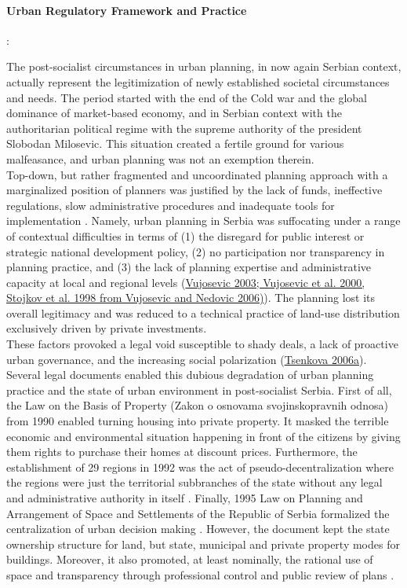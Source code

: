 \documentclass[11pt]{report}
\begin{document}
\paragraph{Urban Regulatory Framework and Practice}:

The post-socialist circumstances in urban planning, in now again Serbian context, actually represent the legitimization of newly established societal circumstances and needs.
The period started with the end of the Cold war and the global dominance of market-based economy, and in Serbian context with the authoritarian political regime with the supreme authority of the president Slobodan Milosevic. This  situation  created a fertile  ground  for various malfeasance, and urban planning was not an exemption therein.
\\

Top-down, but rather fragmented and uncoordinated planning approach with a marginalized position of planners was justified by the lack of funds, 
ineffective regulations, slow administrative procedures and inadequate tools for implementation
\href{ref}{\citealt{peric_evolution_2016}}. 
Namely, urban planning in Serbia was suffocating under a range of contextual difficulties in terms of  (1) the disregard for public interest or strategic national development policy, (2) no participation nor transparency in planning practice, and (3) the lack of planning expertise and administrative capacity at local and regional levels (\href{ref}{Vujosevic  2003;  Vujosevic et  al. 2000, Stojkov et al. 1998 from Vujosevic and Nedovic 2006)}).
The planning lost its overall legitimacy and was reduced to a technical practice of land-use distribution exclusively driven by private investments. 
\\
These factors provoked a legal void susceptible to shady deals, a lack of proactive urban governance, and the increasing social polarization (\href{ref}{Tsenkova 2006a}). 
Several legal documents enabled this dubious degradation of urban planning practice and the state of urban environment in post-socialist Serbia.
First of all, the Law on the Basis of Property (Zakon o osnovama svojinskopravnih odnosa) from 1990 enabled turning housing into private property. It masked the terrible economic and environmental situation happening in front of the citizens by giving them rights to purchase their homes at discount prices. 
Furthermore, the establishment of 29 regions in 1992 was the act of pseudo-decentralization where the regions were just the territorial subbranches of the state without any legal and administrative authority in itself \href{ref}{\citealt{vujosevic_regionalizam_2015}}.
Finally, 1995 Law on Planning and Arrangement of Space and Settlements of the Republic of Serbia formalized the centralization of urban decision making \href{ref}{\citealt{nedovic-budic_mornings_2011}}. However, the document kept the state ownership structure for land, but state, municipal and private property modes for buildings. Moreover, it also promoted, at least nominally, the rational use of space and transparency through professional control and public review of plans \cite{adjustment of planning practice nedovic budic 2001}.
\\    
  
\end{document}

